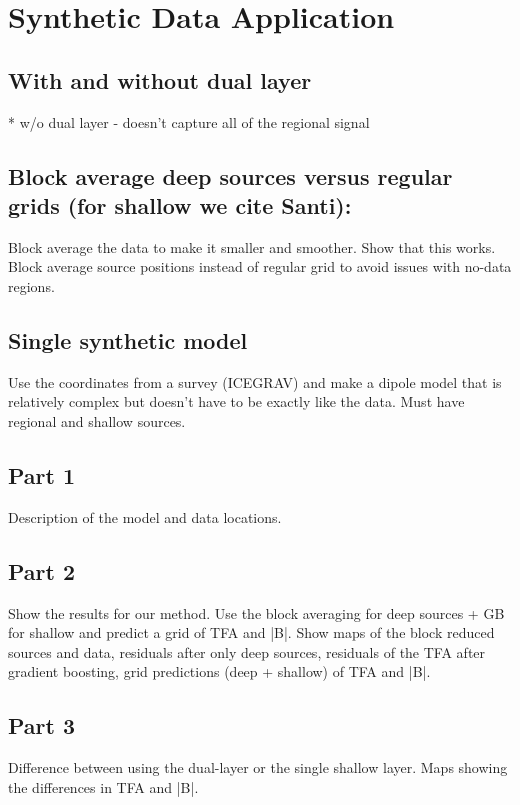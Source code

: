 \section{Synthetic Data Application}

\subsection{With and without dual layer}
* w/o dual layer - doesn't capture all of the regional signal

\subsection{Block average deep sources versus regular grids (for shallow we cite Santi):}
Block average the data to make it smaller and smoother. Show that this works.
Block average source positions instead of regular grid to avoid issues with no-data regions.

\subsection{Single synthetic model}
Use the coordinates from a survey (ICEGRAV) and make a dipole model that is relatively complex but doesn't have to be exactly like the data. Must have regional and shallow sources.


\subsection{Part 1}
Description of the model and data locations.

\subsection{Part 2}
Show the results for our method. Use the block averaging for deep sources + GB for shallow and predict a grid of TFA and |B|. Show maps of the block reduced sources and data, residuals after only deep sources, residuals of the TFA after gradient boosting, grid predictions (deep + shallow) of TFA and |B|.

\subsection{Part 3}
Difference between using the dual-layer or the single shallow layer. Maps showing the differences in TFA and |B|.

